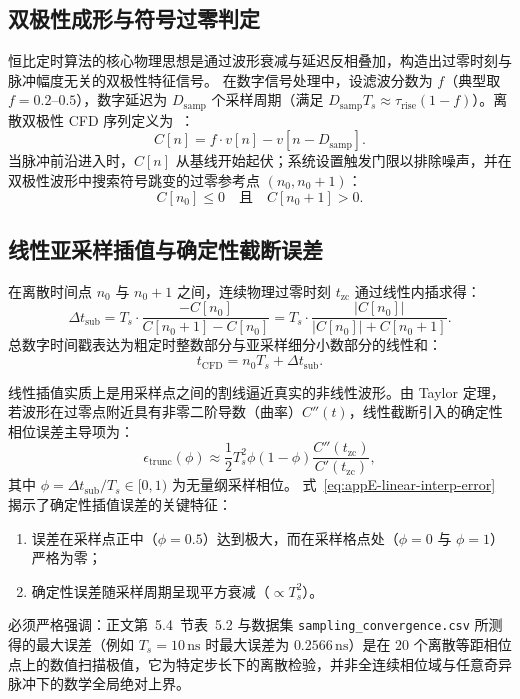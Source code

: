 \subsection{双极性成形与符号过零判定}

恒比定时算法的核心物理思想是通过波形衰减与延迟反相叠加，构造出过零时刻与脉冲幅度无关的双极性特征信号。
在数字信号处理中，设滤波分数为 $f$（典型取 $f = 0.2$–$0.5$），数字延迟为 $D_{\mathrm{samp}}$ 个采样周期（满足 $D_{\mathrm{samp}} T_s \approx \tau_{\mathrm{rise}}(1 - f)$）。离散双极性 CFD 序列定义为~\cite{wu-hongyi-2020-general-purpose-digital-daq-thesis, doctoral-r1-g32-lipschutz-2016-pixie16-ddas-timing}：
\begin{equation}\label{eq:appE-cfd-bipolar}
C[n] = f \cdot v[n] - v[n - D_{\mathrm{samp}}].
\end{equation}
当脉冲前沿进入时，$C[n]$ 从基线开始起伏；系统设置触发门限以排除噪声，并在双极性波形中搜索符号跳变的过零参考点 $(n_0, n_0+1)$：
\begin{equation}\label{eq:appE-zero-cross-condition}
C[n_0] \le 0 \quad \text{且} \quad C[n_0 + 1] > 0.
\end{equation}

\subsection{线性亚采样插值与确定性截断误差}

在离散时间点 $n_0$ 与 $n_0 + 1$ 之间，连续物理过零时刻 $t_{\mathrm{zc}}$ 通过线性内插求得：
\begin{equation}\label{eq:appE-cfd-subsample}
\Delta t_{\mathrm{sub}} = T_s \cdot \frac{-C[n_0]}{C[n_0 + 1] - C[n_0]} = T_s \cdot \frac{|C[n_0]|}{|C[n_0]| + C[n_0 + 1]}.
\end{equation}
总数字时间戳表达为粗定时整数部分与亚采样细分小数部分的线性和：
\begin{equation}\label{eq:appE-timestamp-total}
t_{\mathrm{CFD}} = n_0 T_s + \Delta t_{\mathrm{sub}}.
\end{equation}

线性插值实质上是用采样点之间的割线逼近真实的非线性波形。由 Taylor 定理，若波形在过零点附近具有非零二阶导数（曲率）$C''(t)$，线性截断引入的确定性相位误差主导项为：
\begin{equation}\label{eq:appE-linear-interp-error}
\epsilon_{\mathrm{trunc}}(\phi) \approx \frac{1}{2} T_s^2 \phi (1 - \phi) \frac{C''(t_{\mathrm{zc}})}{C'(t_{\mathrm{zc}})},
\end{equation}
其中 $\phi = \Delta t_{\mathrm{sub}} / T_s \in [0, 1)$ 为无量纲采样相位。
式~\eqref{eq:appE-linear-interp-error} 揭示了确定性插值误差的关键特征：
\begin{enumerate}
\item 误差在采样点正中（$\phi = 0.5$）达到极大，而在采样格点处（$\phi = 0$ 与 $\phi = 1$）严格为零；
\item 确定性误差随采样周期呈现平方衰减（$\propto T_s^2$）。
\end{enumerate}
必须严格强调：正文第~5.4~节表~5.2 与数据集 \texttt{sampling\_convergence.csv} 所测得的最大误差（例如 $T_s = 10\,\text{ns}$ 时最大误差为 $0.2566\,\text{ns}$）是在 $20$ 个离散等距相位点上的数值扫描极值，它为特定步长下的离散检验，并非全连续相位域与任意奇异脉冲下的数学全局绝对上界。

